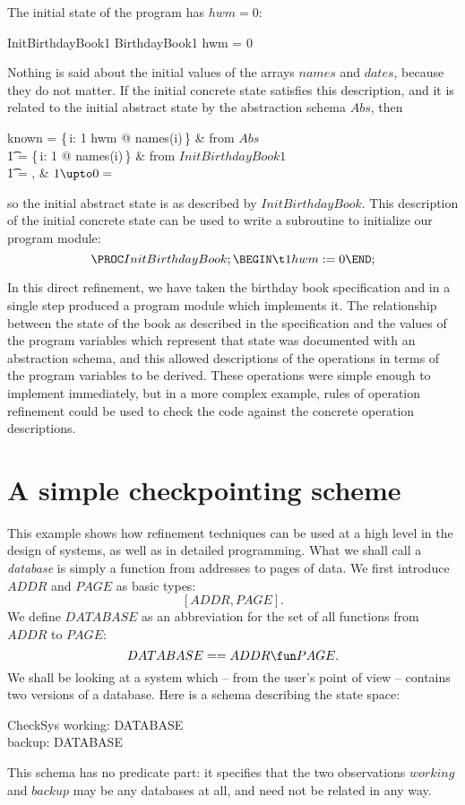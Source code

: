 The initial state of the program has $hwm = 0$:
\begin{schema}{InitBirthdayBook1}
	BirthdayBook1
\where
	hwm = 0
\end{schema}
Nothing is said about the initial values of the arrays $names$ and
$dates$, because they do not matter. If the initial concrete state
satisfies this description, and it is related to the initial abstract
state by the abstraction schema $Abs$, then
\begin{argue}
	known = \{\,i: 1 \upto hwm @ names(i)\,\} & from $Abs$ \\
\t1	= \{\,i: 1  @ names(i)\,\}	& from $InitBirthdayBook1$ \\
\t1	= \empty,				& $1 \upto 0 = \empty$
\end{argue}
so the initial abstract state is as described by $InitBirthdayBook$.
This description of the initial concrete state can be used to write a
subroutine to initialize our program module:
\[
	\PROC InitBirthdayBook; \\
	\BEGIN \\
\t1		hwm := 0 \\
	\END;
\]

In this direct refinement, we have taken the birthday book specification
and in a single step produced a program module which implements it.
The relationship between the state of the book as described in the
specification and the values of the program variables which represent
that state was documented with an abstraction schema, and this allowed
descriptions of the operations in terms of the program variables to
be derived. These operations were simple enough to implement immediately,
but in a more complex example, rules of operation refinement could be
used to check the code against the concrete operation descriptions.

\section{A simple checkpointing scheme}

This example shows how refinement techniques can be used at
a high level in the design of systems, as well as in
detailed programming. 
What we shall call a {\em database\/} is simply a function from
addresses to pages of data. We first introduce $ADDR$ and $PAGE$ as
basic types:
\[ [ADDR, PAGE]. \]
We define $DATABASE$ as an abbreviation for the set of all
functions from $ADDR$ to $PAGE$:
\[ DATABASE == ADDR \fun PAGE. \]
We shall be looking at a system which -- from the user's point of view
-- contains two versions of a database. Here is a schema describing
the state space:
\begin{schema}{CheckSys}
	working: DATABASE \\
	backup: DATABASE
\end{schema}
This schema has no predicate part: it specifies that the two observations
$working$ and $backup$ may be any databases at all, and need not be
related in any way.

